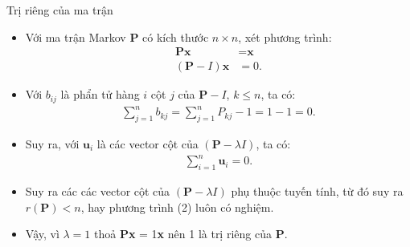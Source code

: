 \begin{frame}{Trị riêng của ma trận}
    \begin{myproof*}{}
\begin{itemize}
    \item[\bullet] Với ma trận Markov $\mathbf{P}$ có kích thước $n \times n$, xét phương trình:
    \begin{align}
        \mathbf{P}\textbf{x} &= \textbf{x} \\
        (\mathbf{P} - I)\textbf{x} &= 0.
    \end{align}
   
    \item[\bullet] Với $b_{ij}$ là phẩn tử hàng $i$ cột $j$ của $\mathbf{P} - I$, $k \leq n$, ta có:
    \begin{align}
        \sum_{j = 1}^{n}b_{kj} =  \sum_{j = 1}^{n}P_{kj} - 1 = 1 - 1 = 0.
    \end{align}

    \item[\bullet] Suy ra, với $\textbf{u}_i$ là các vector cột của $(\mathbf{P}-\lambda I)$, ta có:
    \begin{align}
        \sum_{i=1}^{n} \textbf{u}_i = 0.
    \end{align}

    \item[\bullet] Suy ra các các vector cột của $(\mathbf{P}-\lambda I)$ phụ thuộc tuyến tính, từ đó suy ra $r(\mathbf{P}) < n$, hay phương trình (2) luôn có nghiệm. 

    \item[\bullet] Vậy, vì $\lambda = 1$ thoả $\mathbf{P}$\textbf{x} = 1\textbf{x} nên 1 là trị riêng của $\mathbf{P}$.
\end{itemize}
\end{myproof*}
\end{frame}
